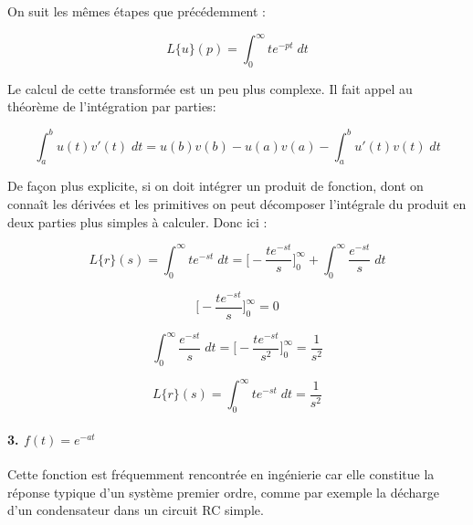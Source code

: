 \documentclass[11pt,a4paper]{article}
\begin{document}
\begin{center}
\end{center}


On suit les mêmes étapes que précédemment : 

\[L\{u\}(p) = \int^{\infty}_{0} t e^{-pt} \; dt\]

Le calcul de cette transformée est un peu plus complexe. Il fait appel au théorème de l'intégration par parties:

\[\int^{b}_{a} u(t) v'(t) \; dt =  u(b) v(b)-u(a) v(a) -\int^{b}_{a} u'(t) v(t) \; dt  \] 

De façon plus explicite, si on doit intégrer un produit de fonction, dont on connaît les dérivées et les primitives on peut décomposer l'intégrale du produit en deux parties plus simples à calculer. Donc ici :

\[L\{ r \}(s) = \int^{\infty}_{0} t e^{-st} \; dt =  \Big[-\frac{te^{-st}}{s}\Big]^{\infty}_{0} + \int^{\infty}_{0} \frac{e^{-st}}{s} \; dt\]

\[ \Big[-\frac{te^{-st}}{s}\Big]^{\infty}_{0} = 0\]

\[ \int^{\infty}_{0} \frac{e^{-st}}{s} \; dt = \Big[-\frac{te^{-st}}{s^2}\Big]^{\infty}_{0} = \frac{1}{s^2}\]

\[ L\{ r \}(s) = \int^{\infty}_{0} t e^{-st} \; dt  = \frac{1}{s^2}\]

\paragraph{\textbf{3.} $f(t) = e^{-at}$}
Cette fonction est fréquemment rencontrée en ingénierie car elle constitue la réponse typique d'un système premier ordre, comme par exemple la décharge d'un condensateur dans un circuit RC simple.
\begin{center}
\end{center}
\end{document}
